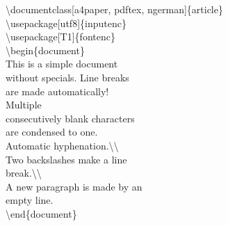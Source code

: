 \color{nounibaredI}\color{nounibaredI}\textbackslash documentclass\color{black}\color{nounibagreenI}[a4paper, pdftex, ngerman]\color{black}\{article\} \\
\color{nounibaredI}\color{nounibaredI}\textbackslash usepackage\color{black}\color{nounibagreenI}[utf8]\color{black}\{inputenc\} \\
\color{nounibaredI}\color{nounibaredI}\textbackslash usepackage\color{black}\color{nounibagreenI}[T1]\color{black}\{fontenc\} \\
\color{nounibaredI}\color{unibablueI}\textbackslash\color{unibablueI}begin\color{black}\color{black}\{document\} \\
This is a simple document \\
without specials. Line breaks \\
are made automatically! \\
Multiple \\
consecutively blank characters  \\
are condensed to one. \\
Automatic hyphenation.\color{nounibaredI}\color{nounibaredI}\textbackslash \color{nounibaredI}\textbackslash \color{black} \\
Two backslashes make a line \\
break.\color{nounibaredI}\color{nounibaredI}\textbackslash \color{nounibaredI}\textbackslash \color{black} \\
A new paragraph is made by an\\
empty line.\\
\color{nounibaredI}\color{unibablueI}\textbackslash\color{unibablueI}end\color{black}\color{black}\{document\} \\

